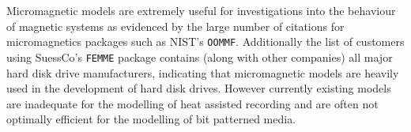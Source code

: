 Micromagnetic models are extremely useful for investigations into the behaviour of magnetic systems as evidenced by the large number of citations for micromagnetics packages such as NIST's \texttt{OOMMF}\cite{oommf-website}. Additionally the list of customers using SuessCo's \texttt{FEMME} package\cite{suessco-website} contains (along with other companies) all major hard disk drive manufacturers, indicating that micromagnetic models are heavily used in the development of hard disk drives. However currently existing models are inadequate for the modelling of heat assisted recording and are often not optimally efficient for the modelling of bit patterned media.







